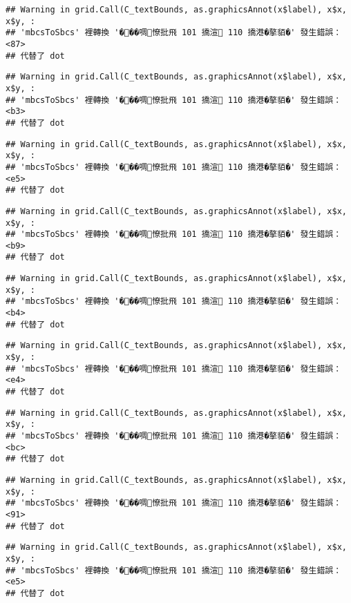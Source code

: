 \documentclass[
]{article}
\begin{document}
\begin{verbatim}
## Warning in grid.Call(C_textBounds, as.graphicsAnnot(x$label), x$x, x$y, :
## 'mbcsToSbcs' 裡轉換 '���啁憭批飛 101 撟渲 110 撟港�摮貊�' 發生錯誤：<87>
## 代替了 dot
\end{verbatim}

\begin{verbatim}
## Warning in grid.Call(C_textBounds, as.graphicsAnnot(x$label), x$x, x$y, :
## 'mbcsToSbcs' 裡轉換 '���啁憭批飛 101 撟渲 110 撟港�摮貊�' 發生錯誤：<b3>
## 代替了 dot
\end{verbatim}

\begin{verbatim}
## Warning in grid.Call(C_textBounds, as.graphicsAnnot(x$label), x$x, x$y, :
## 'mbcsToSbcs' 裡轉換 '���啁憭批飛 101 撟渲 110 撟港�摮貊�' 發生錯誤：<e5>
## 代替了 dot
\end{verbatim}

\begin{verbatim}
## Warning in grid.Call(C_textBounds, as.graphicsAnnot(x$label), x$x, x$y, :
## 'mbcsToSbcs' 裡轉換 '���啁憭批飛 101 撟渲 110 撟港�摮貊�' 發生錯誤：<b9>
## 代替了 dot
\end{verbatim}

\begin{verbatim}
## Warning in grid.Call(C_textBounds, as.graphicsAnnot(x$label), x$x, x$y, :
## 'mbcsToSbcs' 裡轉換 '���啁憭批飛 101 撟渲 110 撟港�摮貊�' 發生錯誤：<b4>
## 代替了 dot
\end{verbatim}

\begin{verbatim}
## Warning in grid.Call(C_textBounds, as.graphicsAnnot(x$label), x$x, x$y, :
## 'mbcsToSbcs' 裡轉換 '���啁憭批飛 101 撟渲 110 撟港�摮貊�' 發生錯誤：<e4>
## 代替了 dot
\end{verbatim}

\begin{verbatim}
## Warning in grid.Call(C_textBounds, as.graphicsAnnot(x$label), x$x, x$y, :
## 'mbcsToSbcs' 裡轉換 '���啁憭批飛 101 撟渲 110 撟港�摮貊�' 發生錯誤：<bc>
## 代替了 dot
\end{verbatim}

\begin{verbatim}
## Warning in grid.Call(C_textBounds, as.graphicsAnnot(x$label), x$x, x$y, :
## 'mbcsToSbcs' 裡轉換 '���啁憭批飛 101 撟渲 110 撟港�摮貊�' 發生錯誤：<91>
## 代替了 dot
\end{verbatim}

\begin{verbatim}
## Warning in grid.Call(C_textBounds, as.graphicsAnnot(x$label), x$x, x$y, :
## 'mbcsToSbcs' 裡轉換 '���啁憭批飛 101 撟渲 110 撟港�摮貊�' 發生錯誤：<e5>
## 代替了 dot
\end{verbatim}
\end{document}
